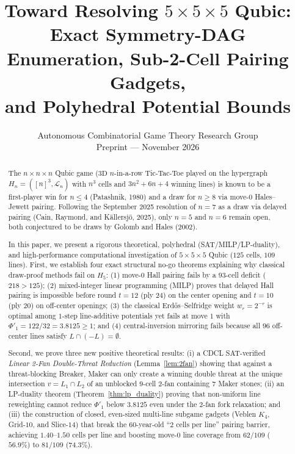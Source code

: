\documentclass[11pt,a4paper]{article}
\title{\textbf{Toward Resolving $5 \times 5 \times 5$ Qubic: \\
Exact Symmetry-DAG Enumeration, Sub-2-Cell Pairing Gadgets, \\
and Polyhedral Potential Bounds}}
\author{
  Autonomous Combinatorial Game Theory Research Group \\
  \small Preprint --- November 2026
}
\date{}
\theoremstyle{definition}
\theoremstyle{remark}
\begin{document}
\maketitle

\begin{abstract}
The $n \times n \times n$ Qubic game ($3\text{D}$ $n$-in-a-row Tic-Tac-Toe played on the hypergraph $H_n = ([n]^3, \mathcal{L}_n)$ with $n^3$ cells and $3n^2 + 6n + 4$ winning lines) is known to be a first-player win for $n \le 4$ (Patashnik, 1980) and a draw for $n \ge 8$ via move-$0$ Hales--Jewett pairing. Following the September 2025 resolution of $n = 7$ as a draw via delayed pairing (Cain, Raymond, and K\"allersj\"o, 2025), only $n = 5$ and $n = 6$ remain open, both conjectured to be draws by Golomb and Hales (2002).

In this paper, we present a rigorous theoretical, polyhedral (SAT/MILP/LP-duality), and high-performance computational investigation of $5 \times 5 \times 5$ Qubic ($125$ cells, $109$ lines). First, we establish four exact structural no-go theorems explaining why classical draw-proof methods fail on $H_5$: (1) move-$0$ Hall pairing fails by a $93$-cell deficit ($218 > 125$); (2) mixed-integer linear programming (MILP) proves that delayed Hall pairing is impossible before round $t = 12$ (ply $24$) on the center opening and $t = 10$ (ply $20$) on off-center openings; (3) the classical Erd\H{o}s--Selfridge weight $w_r = 2^{-r}$ is optimal among $1$-step line-additive potentials yet fails at move $1$ with $\Phi'_1 = 122/32 = 3.8125 \ge 1$; and (4) central-inversion mirroring fails because all $96$ off-center lines satisfy $L \cap (-L) = \emptyset$.

Second, we prove three new positive theoretical results: (i) a CDCL SAT-verified \emph{Linear 2-Fan Double-Threat Reduction} (Lemma~\ref{lem:2fan}) showing that against a threat-blocking Breaker, Maker can only create a winning double threat at the unique intersection $v = L_1 \cap L_2$ of an unblocked $9$-cell 2-fan containing $7$ Maker stones; (ii) an LP-duality theorem (Theorem~\ref{thm:lp_duality}) proving that non-uniform line reweighting cannot reduce $\Phi'_1$ below $3.8125$ even under the 2-fan fork relaxation; and (iii) the construction of closed, even-sized multi-line subgame gadgets (Veblen $K_4$, Grid-$10$, and Slice-$14$) that break the $60$-year-old ``$2$ cells per line'' pairing barrier, achieving $1.40$--$1.50$ cells per line and boosting move-$0$ line coverage from $62/109$ ($56.9\%$) to $81/109$ ($74.3\%$).


\end{abstract}
\end{document}
